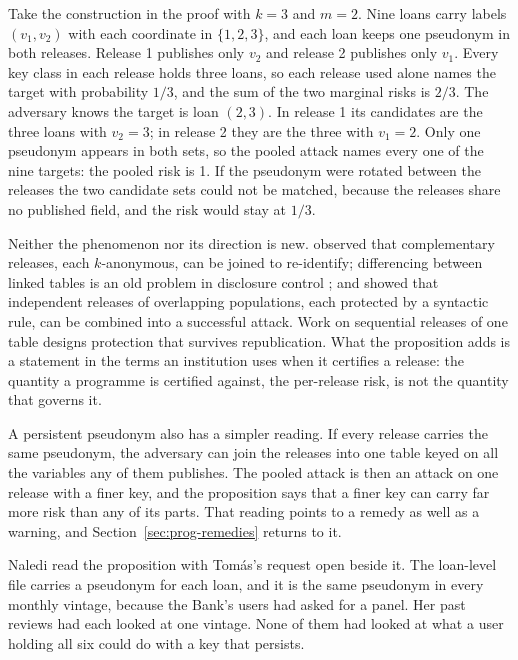 \begin{example}\label{ex:nine-loans}
Take the construction in the proof with $k = 3$ and $m = 2$. Nine loans carry labels
$(v_1, v_2)$ with each coordinate in $\{1, 2, 3\}$, and each loan keeps one pseudonym in
both releases. Release 1 publishes only $v_2$ and release 2 publishes only $v_1$. Every
key class in each release holds three loans, so each release used alone names the target
with probability $1/3$, and the sum of the two marginal risks is $2/3$. The adversary
knows the target is loan $(2, 3)$. In release 1 its candidates are the three loans with
$v_2 = 3$; in release 2 they are the three with $v_1 = 2$. Only one pseudonym appears in
both sets, so the pooled attack names every one of the nine targets: the pooled risk is
1. If the pseudonym were rotated between the releases the two candidate sets could not
be matched, because the releases share no published field, and the risk would stay at
$1/3$.
\end{example}


Neither the phenomenon nor its direction is new. \citet{sweeney2002} observed that
complementary releases, each $k$-anonymous, can be joined to re-identify;
differencing between linked tables is an old problem in disclosure control
\citep[ch.~4]{hundepool2012}; and \citet{ganta2008} showed that independent
releases of overlapping populations, each protected by a syntactic rule, can be
combined into a successful attack. Work on sequential releases of one table
\citep{wang2006,xiao2007} designs protection that survives republication. What the
proposition adds is a statement in the terms an institution uses when it certifies
a release: the quantity a programme is certified against, the per-release risk, is
not the quantity that governs it.

A persistent pseudonym also has a simpler reading. If every release carries the same
pseudonym, the adversary can join the releases into one table keyed on all the
variables any of them publishes. The pooled attack is then an attack on one release
with a finer key, and the proposition says that a finer key can carry far more risk
than any of its parts. That reading points to a remedy as well as a warning, and
Section~\ref{sec:prog-remedies} returns to it.

Naledi read the proposition with Tomás's request open beside it. The loan-level file carries a
pseudonym for each loan, and it is the same pseudonym in every monthly vintage, because the
Bank's users had asked for a panel. Her past reviews had each looked at one vintage. None of them
had looked at what a user holding all six could do with a key that persists.

